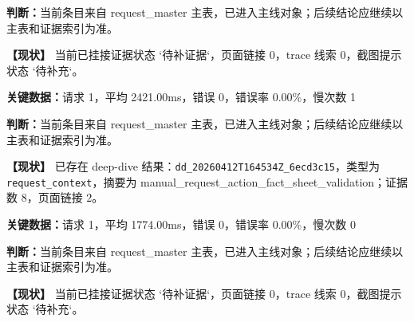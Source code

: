 \noindent\textbf{判断：}当前条目来自 request\_master 主表，已进入主线对象；后续结论应继续以主表和证据索引为准。\par

\noindent\textbf{【现状】} 当前已挂接证据状态 `待补证据`，页面链接 0，trace 线索 0，截图提示状态 `待补充`。\par

\vspace{0.35em}\par

\noindent\textbf{关键数据：}请求 1，平均 2421.00ms，错误 0，错误率 0.00\%，慢次数 1\par

\noindent\textbf{判断：}当前条目来自 request\_master 主表，已进入主线对象；后续结论应继续以主表和证据索引为准。\par

\noindent\textbf{【现状】} 已存在 deep-dive 结果：\texttt{dd\allowbreak{}\_\allowbreak{}20260412T164534Z\allowbreak{}\_\allowbreak{}6ecd3c15}，类型为 \texttt{request\allowbreak{}\_\allowbreak{}context}，摘要为 manual\_request\_action\_fact\_sheet\_validation；证据数 8，页面链接 2。\par

\vspace{0.35em}\par

\noindent\textbf{关键数据：}请求 1，平均 1774.00ms，错误 0，错误率 0.00\%，慢次数 0\par

\noindent\textbf{判断：}当前条目来自 request\_master 主表，已进入主线对象；后续结论应继续以主表和证据索引为准。\par

\noindent\textbf{【现状】} 当前已挂接证据状态 `待补证据`，页面链接 0，trace 线索 0，截图提示状态 `待补充`。\par


